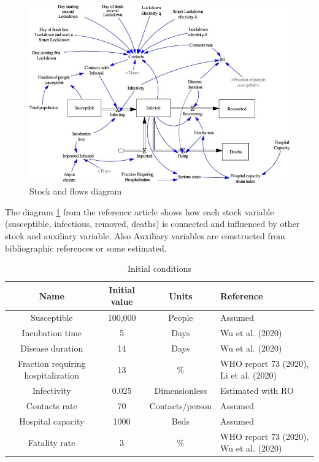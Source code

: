 \documentclass[12pt,a4paper,english]{article}
\begin{document}
    \begin{center}
        \begin{figure}[ht!]
            \includegraphics[scale=1]{1-s2.0-S0048969720324347-gr1.jpg}
            \caption{Stock and flows diagram}
            \label{fig:graph}
        \end{figure}
    \end{center}
    
    The diagram \ref{fig:graph}  from the reference article shows how each stock variable (susceptible, infectious, removed, deaths) is connected and influenced by other stock and auxiliary variable.
    Also 
    Auxiliary variables are constructed from bibliographic references or some estimated.
    
    \begin{table}[h!]
        \centering
        \begin{tabularx}{\textwidth}{|c|c|c|X|}
            \hline
            Name & Initial value & Units & Reference \\
            \hline
            Susceptible	                        & 100,000 &	People & Assumed\\
            Incubation time	                    & 5	 &  Days & Wu et al. (2020)\\
            Disease duration                    & 14	&  Days & Wu et al. (2020)\\
            Fraction requiring hospitalization	& 13  & \% & WHO report 73 (2020), Li et al. (2020) \\
            Infectivity	                        & 0.025 & Dimensionless & Estimated with RO \\
            Contacts rate	                    & 70   & Contacts/person & Assumed \\
            Hospital capacity	                & 1000 & Beds & Assumed \\
            Fatality rate	                    & 3	   & \% & WHO report 73 (2020), Wu et al. (2020) \\
            \hline
        \end{tabularx}
        \caption{Initial conditions \cite{math_article}}
        \label{tab:init_vars}
    \end{table}
    
\end{document}
